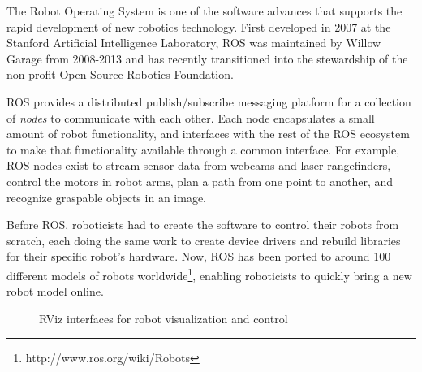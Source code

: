 \documentclass[10pt,twocolumn]{article}
\begin{document}
The Robot Operating System\cite{ros} is one of the software advances that supports the rapid development of new robotics technology.  First developed in 2007 at the Stanford Artificial Intelligence Laboratory, ROS was maintained by Willow Garage from 2008-2013 and has recently transitioned into the stewardship of the non-profit Open Source Robotics Foundation.

ROS provides a distributed publish/subscribe messaging platform for a collection of {\em nodes} to communicate with each other. Each node encapsulates a small amount of robot functionality, and interfaces with the rest of the ROS ecosystem to make that functionality available through a common interface. For example, ROS nodes exist to stream sensor data from webcams and laser rangefinders, control the motors in robot arms, plan a path from one point to another, and recognize graspable objects in an image.

Before ROS, roboticists had to create the software to control their robots from scratch, each doing the same work to create device drivers and rebuild libraries for their specific robot's hardware.  Now, ROS has been ported to around 100 different models of robots worldwide\footnote{http://www.ros.org/wiki/Robots}, enabling roboticists to quickly bring a new robot model online.

\begin{figure}[tbh]
\center{}
\caption{RViz interfaces for robot visualization and control}
\label{rviz}
\end{figure}
\end{document}
